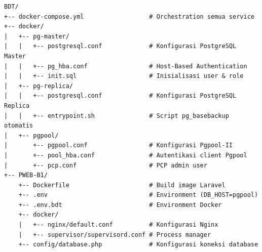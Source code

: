 {\footnotesize
\begin{verbatim}
BDT/
+-- docker-compose.yml                  # Orchestration semua service
+-- docker/
|   +-- pg-master/
|   |   +-- postgresql.conf             # Konfigurasi PostgreSQL Master
|   |   +-- pg_hba.conf                 # Host-Based Authentication
|   |   +-- init.sql                    # Inisialisasi user & role
|   +-- pg-replica/
|   |   +-- postgresql.conf             # Konfigurasi PostgreSQL Replica
|   |   +-- entrypoint.sh               # Script pg_basebackup otomatis
|   +-- pgpool/
|       +-- pgpool.conf                 # Konfigurasi Pgpool-II
|       +-- pool_hba.conf               # Autentikasi client Pgpool
|       +-- pcp.conf                    # PCP admin user
+-- PWEB-B1/
    +-- Dockerfile                      # Build image Laravel
    +-- .env                            # Environment (DB_HOST=pgpool)
    +-- .env.bdt                        # Environment Docker
    +-- docker/
    |   +-- nginx/default.conf          # Konfigurasi Nginx
    |   +-- supervisor/supervisord.conf # Process manager
    +-- config/database.php             # Konfigurasi koneksi database
\end{verbatim}
}
